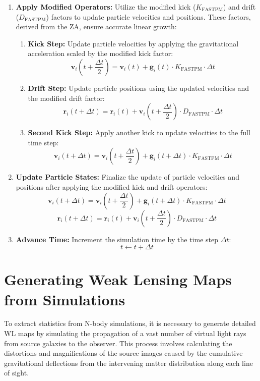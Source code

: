\begin{enumerate}
    \item \textbf{Apply Modified Operators:}
    \label{fastpm:modified-kick-drift}
    Utilize the modified kick ($K_{\text{FASTPM}}$) and drift ($D_{\text{FASTPM}}$) factors to update particle velocities and positions. These factors, derived from the ZA, ensure accurate linear growth:
    
    \begin{enumerate}
        \item \textbf{Kick Step:}
        Update particle velocities by applying the gravitational acceleration scaled by the modified kick factor:
        \[
        \mathbf{v}_i\left(t + \frac{\Delta t}{2}\right) = \mathbf{v}_i(t) + \mathbf{g}_i(t) \cdot K_{\text{FASTPM}} \cdot \Delta t
        \]
        
        \item \textbf{Drift Step:}
        Update particle positions using the updated velocities and the modified drift factor:
        \[
        \mathbf{r}_i(t + \Delta t) = \mathbf{r}_i(t) + \mathbf{v}_i\left(t + \frac{\Delta t}{2}\right) \cdot D_{\text{FASTPM}} \cdot \Delta t
        \]
        
        \item \textbf{Second Kick Step:}
        Apply another kick to update velocities to the full time step:
        \[
        \mathbf{v}_i(t + \Delta t) = \mathbf{v}_i\left(t + \frac{\Delta t}{2}\right) + \mathbf{g}_i(t + \Delta t) \cdot K_{\text{FASTPM}} \cdot \Delta t
        \]
    \end{enumerate}
    
    \item \textbf{Update Particle States:}
    Finalize the update of particle velocities and positions after applying the modified kick and drift operators:
    \[
    \mathbf{v}_i(t + \Delta t) = \mathbf{v}_i\left(t + \frac{\Delta t}{2}\right) + \mathbf{g}_i(t + \Delta t) \cdot K_{\text{FASTPM}} \cdot \Delta t
    \]
    \[
    \mathbf{r}_i(t + \Delta t) = \mathbf{r}_i(t) + \mathbf{v}_i\left(t + \frac{\Delta t}{2}\right) \cdot D_{\text{FASTPM}} \cdot \Delta t
    \]
    
    \item \textbf{Advance Time:}
    Increment the simulation time by the time step $\Delta t$:
    \[
    t \leftarrow t + \Delta t
    \]
\end{enumerate}

\section{Generating Weak Lensing Maps from Simulations}
\label{sec:weak-lensing-generation}
To extract statistics from N-body simulations, it is necessary to generate detailed WL maps by simulating the propagation of a vast number of virtual light rays from source galaxies to the observer. This process involves calculating the distortions and magnifications of the source images caused by the cumulative gravitational deflections from the intervening matter distribution along each line of sight.

